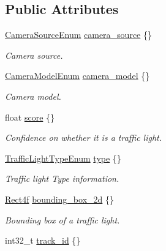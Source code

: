 \subsection*{Public Attributes}
\begin{DoxyCompactItemize}
\item 
\hyperlink{structmaf__perception__interface_1_1CameraSourceEnum}{Camera\+Source\+Enum} \hyperlink{structmaf__perception__interface_1_1PhysicalTrafficLightBulb_a127bf9160f209c8ee2e68b4ed6ac9936}{camera\+\_\+source} \{\}
\begin{DoxyCompactList}\small\item\em Camera source. \end{DoxyCompactList}\item 
\hyperlink{structmaf__perception__interface_1_1CameraModelEnum}{Camera\+Model\+Enum} \hyperlink{structmaf__perception__interface_1_1PhysicalTrafficLightBulb_a32b7824eb127f519d30a66816b4a07ea}{camera\+\_\+model} \{\}
\begin{DoxyCompactList}\small\item\em Camera model. \end{DoxyCompactList}\item 
float \hyperlink{structmaf__perception__interface_1_1PhysicalTrafficLightBulb_a252a0c5fb19589ddc4fe8795d6f2faf6}{score} \{\}
\begin{DoxyCompactList}\small\item\em Confidence on whether it is a traffic light. \end{DoxyCompactList}\item 
\hyperlink{structmaf__perception__interface_1_1TrafficLightTypeEnum}{Traffic\+Light\+Type\+Enum} \hyperlink{structmaf__perception__interface_1_1PhysicalTrafficLightBulb_a66b84c7b91778e0e411f6388b66eaa03}{type} \{\}
\begin{DoxyCompactList}\small\item\em Traffic light Type information. \end{DoxyCompactList}\item 
\hyperlink{structmaf__perception__interface_1_1Rect4f}{Rect4f} \hyperlink{structmaf__perception__interface_1_1PhysicalTrafficLightBulb_a3c0db5a84915edbdcd722f9d9bced6db}{bounding\+\_\+box\+\_\+2d} \{\}
\begin{DoxyCompactList}\small\item\em Bounding box of a traffic light. \end{DoxyCompactList}\item 
int32\+\_\+t \hyperlink{structmaf__perception__interface_1_1PhysicalTrafficLightBulb_ab33fea29126db541f6f3cabc67147b04}{track\+\_\+id} \{\}

\end{DoxyCompactItemize}
